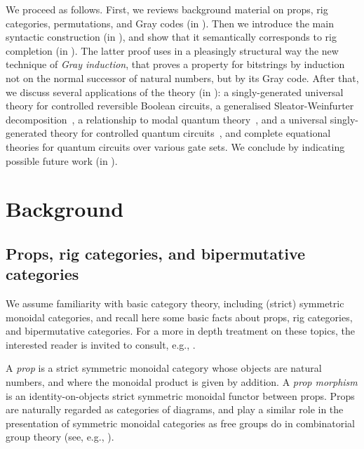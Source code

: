 \documentclass[a4paper]{article}
\theoremstyle{plain}
\theoremstyle{definition}
\begin{document}
We proceed as follows. First, we reviews background material on props, rig categories, permutations, and Gray codes (in ).
Then we introduce the main syntactic construction (in ), and show that it semantically corresponds to rig completion (in ). The latter proof uses in a pleasingly structural way the new technique of \emph{Gray induction}, that proves a property for bitstrings by induction not on the normal successor of natural numbers, but by its Gray code.
After that, we discuss several applications of the theory (in ): a singly-generated universal theory for controlled reversible Boolean circuits, a generalised Sleator-Weinfurter decomposition~\cite{sleatorweinfurter}, a relationship to modal quantum theory~\cite{schumacherwestmoreland:modal}, and a universal singly-generated theory for controlled quantum circuits~\cite{kaarsgaard:ctrlv}, and complete equational theories for quantum circuits over various gate sets.
We conclude by indicating possible future work (in ).


\section{Background}
\label{sec:background}

\subsection{Props, rig categories, and bipermutative categories}
We assume familiarity with basic category theory, including (strict)
symmetric monoidal categories, and recall here some basic facts about
props, rig categories, and bipermutative categories. For a more in
depth treatment on these topics, the interested reader is invited to
consult, e.g., \cite{bimonoidal-book,maclane:props}.

A \emph{prop} is a strict symmetric monoidal category whose objects
are natural numbers, and where the monoidal product is given by
addition. A \emph{prop morphism} is an identity-on-objects strict
symmetric monoidal functor between props. Props are naturally regarded
as categories of diagrams, and play a similar role in the presentation
of symmetric monoidal categories as free groups do in combinatorial
group theory (see, e.g., \cite{bonchisobocinskizanasi:hopf}).
\end{document}

